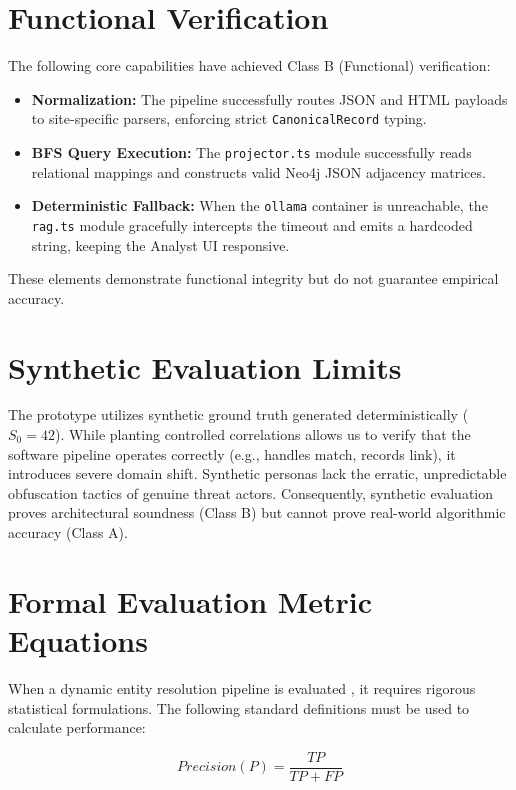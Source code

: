 \section{Functional Verification}
\label{sec:eval-functional}
The following core capabilities have achieved Class B (Functional) verification:
\begin{itemize}
    \item \textbf{Normalization:} The pipeline successfully routes JSON and HTML payloads to site-specific parsers, enforcing strict \texttt{CanonicalRecord} typing.
    \item \textbf{BFS Query Execution:} The \texttt{projector.ts} module successfully reads relational mappings and constructs valid Neo4j JSON adjacency matrices.
    \item \textbf{Deterministic Fallback:} When the \texttt{ollama} container is unreachable, the \texttt{rag.ts} module gracefully intercepts the timeout and emits a hardcoded string, keeping the Analyst UI responsive.
\end{itemize}
These elements demonstrate functional integrity but do not guarantee empirical accuracy.

\section{Synthetic Evaluation Limits}
\label{sec:eval-synthetic}
The prototype utilizes synthetic ground truth generated deterministically ($S_0=42$). While planting controlled correlations allows us to verify that the software pipeline operates correctly (e.g., handles match, records link), it introduces severe domain shift. Synthetic personas lack the erratic, unpredictable obfuscation tactics of genuine threat actors. Consequently, synthetic evaluation proves architectural soundness (Class B) but cannot prove real-world algorithmic accuracy (Class A).

\section{Formal Evaluation Metric Equations}
\label{sec:eval-equations}
When a dynamic entity resolution pipeline is evaluated \cite{christen2012data}, it requires rigorous statistical formulations. The following standard definitions must be used to calculate performance:

\begin{equation}
\label{eq:precision}
Precision (P) = \frac{TP}{TP + FP}
\end{equation}

